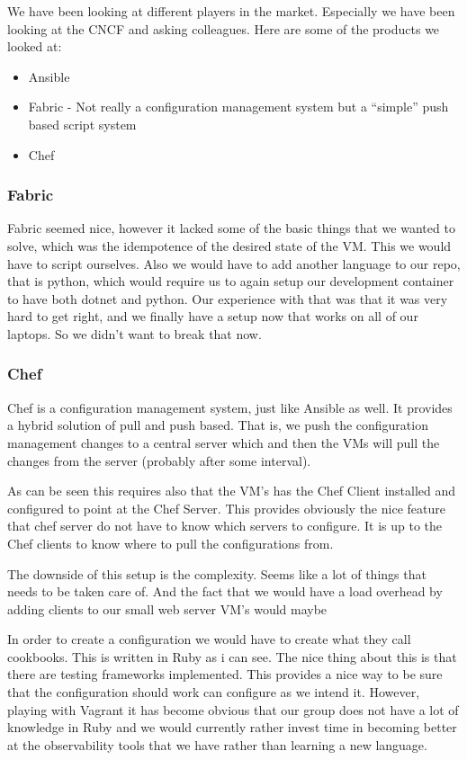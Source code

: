We have been looking at different players in the market. Especially we have been looking at the CNCF and asking colleagues. Here are some of the products we looked at:

\begin{itemize}
    \item Ansible
    \item Fabric - Not really a configuration management system but a “simple” push based script system
    \item Chef
\end{itemize}

\subsubsection{Fabric}
Fabric seemed nice, however it lacked some of the basic things that we wanted to solve, which was the idempotence of the desired state of the VM. This we would have to script ourselves. Also we would have to add another language to our repo, that is python, which would require us to again setup our development container to have both dotnet and python. Our experience with that was that it was very hard to get right, and we finally have a setup now that works on all of our laptops. So we didn’t want to break that now. 

\subsubsection{Chef}
Chef is a configuration management system, just like Ansible as well. It provides a hybrid solution of pull and push based. That is, we push the configuration management changes to a central server which and then the VMs will pull the changes from the server (probably after some interval). 

As can be seen this requires also that the VM’s has the Chef Client installed and configured to point at the Chef Server. This provides obviously the nice feature that chef server do not have to know which servers to configure. It is up to the Chef clients to know where to pull the configurations from. 

The downside of this setup is the complexity. Seems like a lot of things that needs to be taken care of. And the fact that we would have a load overhead by adding clients to our small web server VM’s would maybe

In order to create a configuration we would have to create what they call cookbooks. This is written in Ruby as i can see. The nice thing about this is that there are testing frameworks implemented. This provides a nice way to be sure that the configuration should work can configure as we intend it. However, playing with Vagrant it has become obvious that our group does not have a lot of knowledge in Ruby and we would currently rather invest time in becoming better at the observability tools that we have rather than learning a new language.

